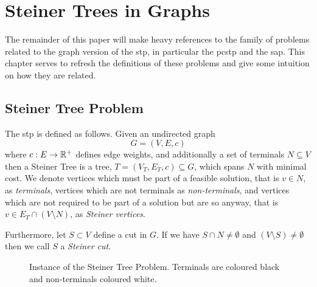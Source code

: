 \chapter{Steiner Trees in Graphs}
\label{chap:steiner-trees}

The remainder of this paper will make heavy references to the family of problems related to the
graph version of the \gls{stp}, in particular the \gls{pcstp} and the \gls{sap}.
This chapter serves to refresh the definitions of these
problems and give some intuition on how they are related.

\section{Steiner Tree Problem}
The \gls{stp} is defined as follows.
Given an undirected graph
$$G = (V, E, c)$$
 where $c: E \to \mathbb{R}^+$ defines edge weights, and additionally a set of terminals $N \subseteq V$ then
a Steiner Tree is a tree, $T = (V_T, E_T, c) \subseteq G$, which spans $N$ with minimal cost. We denote vertices which must be part of a feasible solution,
that is $v \in N$, as \textit{terminals}, vertices which are not terminals as \textit{non-terminals},
and vertices which are not required to be part of a solution but are so anyway, that is
$v \in E_T \cap (V \setminus N)$, as \textit{Steiner vertices}.

Furthermore, let $S \subset V$ define a cut in $G$. If we have $S \cap N \neq \emptyset$ and $(V \setminus S) \neq \emptyset$ then we
 call $S$ a \textit{Steiner cut}.

\begin{figure}[h]\centering
{}
\caption{Instance of the Steiner Tree Problem. Terminals are coloured black and non-terminals coloured white.}
\label{fig:stp:01}
\end{figure}

